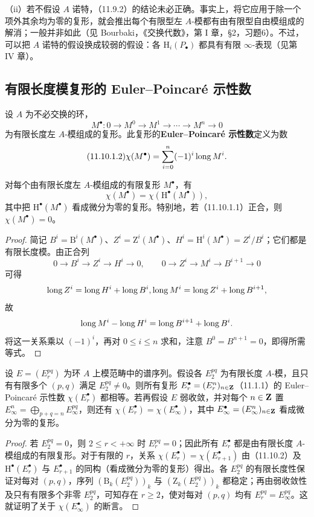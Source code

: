 （ii）若不假设 $A$ 诺特，（11.9.2）的结论未必正确。事实上，将它应用于除一个项外其余均为零的复形，就会推出每个有限型左 $A$-模都有由有限型自由模组成的解消；一般并非如此（见 Bourbaki，《交换代数》，第 I 章，§2，习题6）。不过，可以把 $A$ 诺特的假设换成较弱的假设：各 $\mathrm H_i(P_\bullet)$ 都具有有限 $\infty$-表现（见第 IV 章）。

\subsection{有限长度模复形的 Euler--Poincaré 示性数}
设 $A$ 为不必交换的环，
\begin{equation}\tag{11.10.1.1}
M^\bullet:0\longrightarrow M^0\longrightarrow M^1\longrightarrow\cdots\longrightarrow M^n\longrightarrow0
\end{equation}
为有限长度左 $A$-模组成的复形。此复形的\textbf{Euler--Poincaré 示性数}定义为数
\begin{equation}\tag{11.10.1.2}
\chi(M^\bullet)=\sum_{i=0}^n(-1)^i\len M^i.
\end{equation}

对每个由有限长度左 $A$-模组成的有限复形 $M^\bullet$，有
\[
\chi(M^\bullet)=\chi(\mathrm H^\bullet(M^\bullet)),
\]
其中把 $\mathrm H^\bullet(M^\bullet)$ 看成微分为零的复形。特别地，若（11.10.1.1）正合，则 $\chi(M^\bullet)=0$。
\begin{proof}
简记 $B^i=\mathrm B^i(M^\bullet)$、$Z^i=\mathrm Z^i(M^\bullet)$、$H^i=\mathrm H^i(M^\bullet)=Z^i/B^i$；它们都是有限长度模。由正合列
\[
0\to B^i\to Z^i\to H^i\to0,\qquad
0\to Z^i\to M^i\to B^{i+1}\to0
\]
可得
\[
\operatorname{long} Z^i=\operatorname{long} H^i+\operatorname{long} B^i,
\operatorname{long} M^i=\operatorname{long} Z^i+\operatorname{long} B^{i+1},
\]
故
\[
\operatorname{long} M^i-\operatorname{long} H^i=\operatorname{long} B^{i+1}+\operatorname{long} B^i.
\]
将这一关系乘以 $(-1)^i$，再对 $0\leq i\leq n$ 求和，注意 $B^0=B^{n+1}=0$，即得所需等式。
\end{proof}

设 $E=(E_r^{pq})$ 为环 $A$ 上模范畴中的谱序列。假设各 $E_2^{pq}$ 为有限长度 $A$-模，且只有有限多个 $(p,q)$ 满足 $E_2^{pq}\ne0$。则所有复形 $E_r^\bullet=(E_r^n)_{n\in\mathbf Z}$（11.1.1）的 Euler--Poincaré 示性数 $\chi(E_r^\bullet)$ 都相等。若再假设 $E$ 弱收敛，并对每个 $n\in\mathbf Z$ 置 $E_\infty^n=\bigoplus_{p+q=n}E_\infty^{pq}$，则还有 $\chi(E_r^\bullet)=\chi(E_\infty^\bullet)$，其中 $E_\infty^\bullet=(E_\infty^n)_{n\in\mathbf Z}$ 看成微分为零的复形。
\begin{proof}
若 $E_2^{pq}=0$，则 $2\leq r<+\infty$ 时 $E_r^{pq}=0$；因此所有 $E_r^\bullet$ 都是由有限长度 $A$-模组成的有限复形。对于有限的 $r$，关系 $\chi(E_r^\bullet)=\chi(E_{r+1}^\bullet)$ 由（11.10.2）及 $\mathrm H^\bullet(E_r^\bullet)$ 与 $E_{r+1}^\bullet$ 的同构（看成微分为零的复形）得出。各 $E_2^{pq}$ 的有限长度性保证对每对 $(p,q)$，序列 $(\mathrm B_k(E_2^{pq}))_k$ 与 $(\mathrm Z_k(E_2^{pq}))_k$ 都稳定；再由弱收敛性及只有有限多个非零 $E_2^{pq}$，可知存在 $r\geq2$，使对每对 $(p,q)$ 均有 $E_r^{pq}=E_\infty^{pq}$。这就证明了关于 $\chi(E_\infty^\bullet)$ 的断言。
\end{proof}\par

